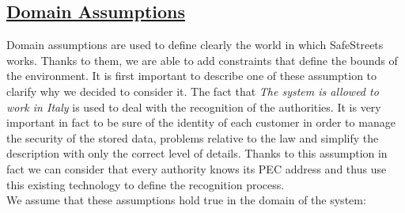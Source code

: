 \subsection[Domain Assumptions]{\hyperlink{toc}{Domain Assumptions}}
	\label{sec:domainAssumptions}
	Domain assumptions are used to define clearly the world in which SafeStreets works. Thanks to them, we are able to add constraints that define the bounds of the environment. It is first important to describe one of these assumption to clarify why we decided to consider it. The fact that \emph{The system is allowed to work in Italy} is used to deal with the recognition of the authorities. It is very important in fact to be sure of the identity of each customer in order to manage the security of the stored data, problems relative to the law and simplify the description with only the correct level of details. Thanks to this assumption in fact we can consider that every authority knows its PEC address and thus use this existing technology to define the recognition process. \\
	
	We assume that these assumptions hold true in the domain of the system:
		
